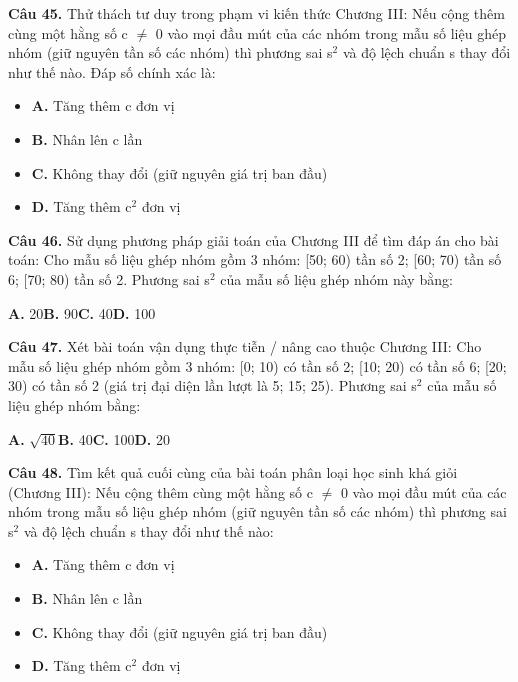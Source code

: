\documentclass[11pt,a4paper]{article}
\begin{document}
\textbf{\color{primary} Câu 45.} Thử thách tư duy trong phạm vi kiến thức Chương III: Nếu cộng thêm cùng một hằng số c $\ne$ 0 vào mọi đầu mút của các nhóm trong mẫu số liệu ghép nhóm (giữ nguyên tần số các nhóm) thì phương sai s$^2$ và độ lệch chuẩn s thay đổi như thế nào. Đáp số chính xác là:\par
\begin{itemize}\setlength{\itemsep}{1pt}\setlength{\parskip}{0pt}
  \item[] \textbf{A.} Tăng thêm c đơn vị
  \item[] \textbf{B.} Nhân lên c lần
  \item[] \textbf{C.} Không thay đổi (giữ nguyên giá trị ban đầu)
  \item[] \textbf{D.} Tăng thêm c$^2$ đơn vị
\end{itemize}\vspace{2pt}
\textbf{\color{primary} Câu 46.} Sử dụng phương pháp giải toán của Chương III để tìm đáp án cho bài toán: Cho mẫu số liệu ghép nhóm gồm 3 nhóm: [50; 60) tần số 2; [60; 70) tần số 6; [70; 80) tần số 2. Phương sai s$^2$ của mẫu số liệu ghép nhóm này bằng:\par
\hspace*{1.5em}\textbf{A.} 20\quad\quad \textbf{B.} 90\quad\quad \textbf{C.} 40\quad\quad \textbf{D.} 100\par\vspace{2pt}
\textbf{\color{primary} Câu 47.} Xét bài toán vận dụng thực tiễn / nâng cao thuộc Chương III: Cho mẫu số liệu ghép nhóm gồm 3 nhóm: [0; 10) có tần số 2; [10; 20) có tần số 6; [20; 30) có tần số 2 (giá trị đại diện lần lượt là 5; 15; 25). Phương sai s$^2$ của mẫu số liệu ghép nhóm bằng:\par
\hspace*{1.5em}\textbf{A.} $\sqrt{40}$\quad\quad \textbf{B.} 40\quad\quad \textbf{C.} 100\quad\quad \textbf{D.} 20\par\vspace{2pt}
\textbf{\color{primary} Câu 48.} Tìm kết quả cuối cùng của bài toán phân loại học sinh khá giỏi (Chương III): Nếu cộng thêm cùng một hằng số c $\ne$ 0 vào mọi đầu mút của các nhóm trong mẫu số liệu ghép nhóm (giữ nguyên tần số các nhóm) thì phương sai s$^2$ và độ lệch chuẩn s thay đổi như thế nào:\par
\begin{itemize}\setlength{\itemsep}{1pt}\setlength{\parskip}{0pt}
  \item[] \textbf{A.} Tăng thêm c đơn vị
  \item[] \textbf{B.} Nhân lên c lần
  \item[] \textbf{C.} Không thay đổi (giữ nguyên giá trị ban đầu)
  \item[] \textbf{D.} Tăng thêm c$^2$ đơn vị
\end{itemize}\vspace{2pt}
\end{document}
